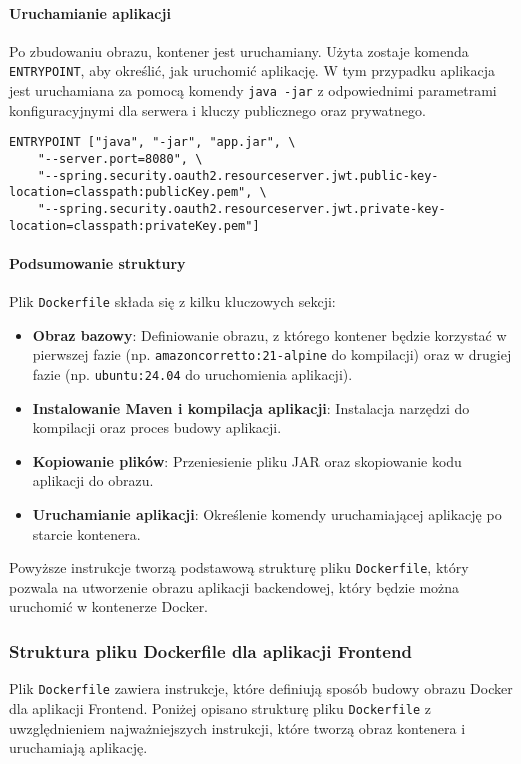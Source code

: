 \paragraph{Uruchamianie aplikacji}
Po zbudowaniu obrazu, kontener jest uruchamiany. Użyta zostaje komenda \texttt{ENTRYPOINT}, aby określić, jak uruchomić aplikację. W tym przypadku aplikacja jest uruchamiana za pomocą komendy \texttt{java -jar} z odpowiednimi parametrami konfiguracyjnymi dla serwera i kluczy publicznego oraz prywatnego.
\begin{lstlisting}
ENTRYPOINT ["java", "-jar", "app.jar", \
    "--server.port=8080", \
    "--spring.security.oauth2.resourceserver.jwt.public-key-location=classpath:publicKey.pem", \
    "--spring.security.oauth2.resourceserver.jwt.private-key-location=classpath:privateKey.pem"]
\end{lstlisting}

\paragraph{Podsumowanie struktury}
Plik \texttt{Dockerfile} składa się z kilku kluczowych sekcji:
\begin{itemize}
    \item \textbf{Obraz bazowy}: Definiowanie obrazu, z którego kontener będzie korzystać w pierwszej fazie (np. \texttt{amazoncorretto:21-alpine} do kompilacji) oraz w drugiej fazie (np. \texttt{ubuntu:24.04} do uruchomienia aplikacji).
    \item \textbf{Instalowanie Maven i kompilacja aplikacji}: Instalacja narzędzi do kompilacji oraz proces budowy aplikacji.
    \item \textbf{Kopiowanie plików}: Przeniesienie pliku JAR oraz skopiowanie kodu aplikacji do obrazu.
    \item \textbf{Uruchamianie aplikacji}: Określenie komendy uruchamiającej aplikację po starcie kontenera.
\end{itemize}

Powyższe instrukcje tworzą podstawową strukturę pliku \texttt{Dockerfile}, który pozwala na utworzenie obrazu aplikacji backendowej, który będzie można uruchomić w kontenerze Docker.

\subsubsection{Struktura pliku Dockerfile dla aplikacji Frontend}

Plik \texttt{Dockerfile} zawiera instrukcje, które definiują sposób budowy obrazu Docker dla aplikacji Frontend. Poniżej opisano strukturę pliku \texttt{Dockerfile} z uwzględnieniem najważniejszych instrukcji, które tworzą obraz kontenera i uruchamiają aplikację.

